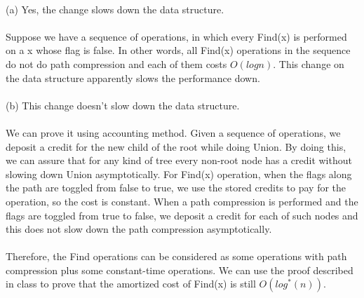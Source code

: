 \begin{problem}{3} ~\\
(a) Yes, the change slows down the data structure.\\
\\
Suppose we have a sequence of operations, in which every Find(x) is performed on a x whose flag is false. In other words, all Find(x) operations in the sequence do not do path compression and each of them costs $O(logn)$. This change on the data structure apparently slows the performance down. \\
\\
(b) This change doesn't slow down the data structure.\\
\\
We can prove it using accounting method. Given a sequence of operations, we deposit a credit for the new child of the root while doing Union. By doing this, we can assure that for any kind of tree every non-root node has a credit without slowing down Union asymptotically. For Find(x) operation, when the flags along the path are toggled from false to true, we use the stored credits to pay for the operation, so the cost is constant. When a path compression is performed and the flags are toggled from true to false, we deposit a credit for each of such nodes and this does not slow down the path compression asymptotically.\\
\\
Therefore, the Find operations can be considered as some operations with path compression plus some constant-time operations. We can use the proof described in class to prove that the amortized cost of Find(x) is still $O(log^*(n))$.
\end{problem}
